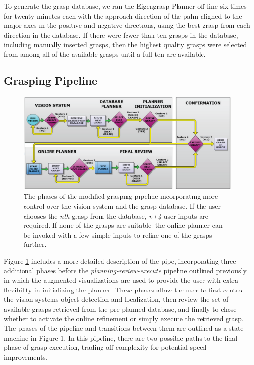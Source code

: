 To generate the grasp database, we ran the Eigengrasp Planner off-line six times for twenty minutes each with the approach direction of the palm aligned to the major axes in the positive and negative directions, using the best grasp from each direction in the database. If there were fewer than ten grasps in the database, including manually inserted grasps, then the highest quality grasps were selected from among all of the available grasps until a full ten are available. 

\subsection{Grasping Pipeline}
\begin{figure}[ht!]
	\centering
	\includegraphics[width=1.7\columnwidth]{pipeline_2.png}
	\caption{The phases of the modified grasping pipeline incorporating more control over the vision system and the grasp database. If the user chooses the \emph{nth} grasp from the database, \emph{n+4} user inputs are required. If none of the grasps are suitable, the online planner can be invoked with a few simple inputs to refine one of the grasps further.}
	\label{fig:pipeline_2}
\end{figure}
\label{sec:pipline_2}
Figure \ref{fig:pipeline_2} includes a more detailed description of the pipe, incorporating three additional phases before the  \emph{planning-review-execute} pipeline outlined previously in which the augmented visualizations are used to provide the user with extra flexibility in initializing the planner. These phases allow the user to first control the vision systems object detection and localization, then review the set of available grasps retrieved from the pre-planned database, and finally to chose whether to activate the online refinement or simply execute the retrieved grasp. The phases of the pipeline and transitions between them are outlined as a state machine in Figure \ref{fig:pipeline_2}. In this pipeline,  there are two possible paths to the final phase of grasp execution, trading off complexity for potential speed improvements. 


